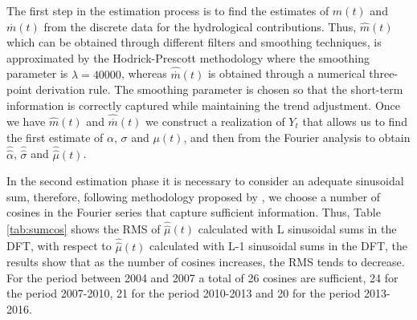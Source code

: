 \documentclass[12pt,halfline,a4paper]{ouparticle}
\begin{document}
The first step in the estimation process is to find the estimates of $m(t)$ and $\stackrel{.}{m}(t)$ from the discrete data for the hydrological contributions. Thus, $\hat{m}(t)$ which can be obtained through different filters and smoothing techniques, is approximated by the Hodrick-Prescott methodology where the smoothing parameter is $\lambda=40000$, whereas $\hat{\stackrel{.}{m}}(t)$ is obtained through a numerical three-point derivation rule. The smoothing parameter is chosen so that the short-term information is correctly captured while maintaining the trend adjustment. Once we have $\hat{m}(t)$ and $\hat{\stackrel{.}{m}}(t)$ we construct a realization of $Y_{t}$ that allows us to find the first estimate of $\alpha$, $\sigma$ and $\mu(t)$, and then from the Fourier analysis to obtain $\hat{\hat{\alpha}}$, $\hat{\hat{\sigma}}$ and $\hat{\hat{\mu}}(t)$.

In the second estimation phase it is necessary to consider an adequate sinusoidal sum, therefore, following methodology proposed by \cite{Monsalve2017}, we choose a number of cosines in the Fourier series that capture sufficient information. Thus, Table \ref{tab:sumcos} shows the RMS of $\hat{\hat{\mu}}(t)$ calculated with L sinusoidal sums in the DFT, with respect to $\hat{\hat{\mu}}(t)$ calculated with L-1 sinusoidal sums in the DFT, the results show that as the number of cosines increases, the RMS tends to decrease. For the period between 2004 and 2007 a total of 26 cosines are sufficient, 24 for the period 2007-2010, 21 for the period 2010-2013 and 20 for the period 2013-2016.
\end{document}
